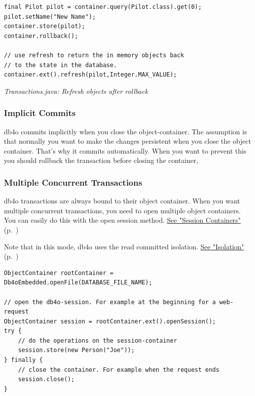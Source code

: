 \begin{lstlisting}
final Pilot pilot = container.query(Pilot.class).get(0);
pilot.setName("New Name");
container.store(pilot);
container.rollback();

// use refresh to return the in memory objects back
// to the state in the database.
container.ext().refresh(pilot,Integer.MAX_VALUE);
\end{lstlisting}

{\small\itshape Transactions.java: Refresh objects after rollback\par}
\medskip

\subsubsection*{Implicit Commits}

db4o commits implicitly when you close the object-container. The assumption is that normally you want to make the changes persistent when you close the object container. That's why it commits automatically. When you want to prevent this you should rollback the transaction before closing the container,

\subsubsection*{Multiple Concurrent Transactions}

db4o transactions are always bound to their object container. When you want multiple concurrent transactions, you need to open multiple object containers. You can easily do this with the open session method. \hyperref[ref:advanced-topics-session-containers]{See "Session Containers"} (p.~\pageref{ref:advanced-topics-session-containers})

Note that in this mode, db4o uses the read committed isolation. \hyperref[ref:basics-acid-and-transactions-isolation]{See "Isolation"} (p.~\pageref{ref:basics-acid-and-transactions-isolation})

\begin{lstlisting}
ObjectContainer rootContainer = Db4oEmbedded.openFile(DATABASE_FILE_NAME);

// open the db4o-session. For example at the beginning for a web-request
ObjectContainer session = rootContainer.ext().openSession();
try {
    // do the operations on the session-container
    session.store(new Person("Joe"));
} finally {
    // close the container. For example when the request ends
    session.close();
}
\end{lstlisting}

